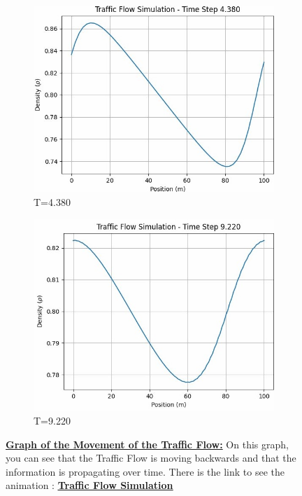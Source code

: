 \documentclass{article}
\begin{document}
\begin{figure}[H]
		\begin{subfigure}{0.4\textwidth}
			\centering
			\includegraphics[width=\textwidth]{AniE3_LF.jpg}
			\caption{T=4.380}
			\label{fig:4380}
		\end{subfigure}
		\begin{subfigure}{0.4\textwidth}
			\centering
			\includegraphics[width=\textwidth]{AniE4_LF.jpg}
			\caption{T=9.220}
			\label{fig:9220}
		\end{subfigure}
		\caption[Graph of the Movement of the Traffic Flow]{\textbf{\underline{Graph of the Movement of the Traffic Flow:}} On this graph, you can see that the Traffic Flow is moving backwards and that the information is propagating over time. There is the link to see the animation : \href{https://github.com/FlorentGerbaud/Simple-road-traffic-modeling/blob/Flo-PDE/SRTM/EDPMethod/CasTestToLaunch/TestToLaunch/Modele_IC_S/LaxFriedrichs/traffic_flow_animation.gif}{\textbf{\underline{Traffic Flow Simulation}}}}
		\label{fig:GraphLF}
	\end{figure}
\end{document}
